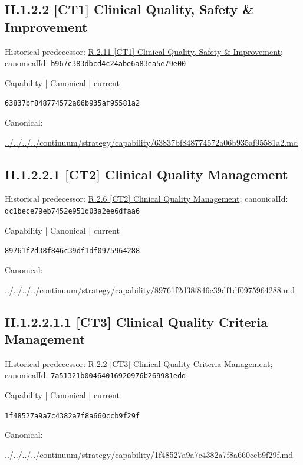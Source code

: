 \documentclass[10pt,a4paper]{article}
\begin{document}
\subsection*{II.1.2.2 [CT1] Clinical Quality, Safety \& Improvement}
Historical predecessor: \hyperref[element-b967c383dbcd4c24abe6a83ea5e79e00]{R.2.11 [CT1] Clinical Quality, Safety \& Improvement}; canonicalId: \texttt{b967c383dbcd4c24abe6a83ea5e79e00}\par
\label{element-63837bf848774572a06b935af95581a2}
{\small Capability | Canonical | current}\par
\texttt{63837bf848774572a06b935af95581a2}\par
Canonical: \par
{\footnotesize\url{../../../../continuum/strategy/capability/63837bf848774572a06b935af95581a2.md}}\par
\subsection*{II.1.2.2.1 [CT2] Clinical Quality Management}
Historical predecessor: \hyperref[element-dc1bece79eb7452e951d03a2ee6dfaa6]{R.2.6 [CT2] Clinical Quality Management}; canonicalId: \texttt{dc1bece79eb7452e951d03a2ee6dfaa6}\par
\label{element-89761f2d38f846c39df1df0975964288}
{\small Capability | Canonical | current}\par
\texttt{89761f2d38f846c39df1df0975964288}\par
Canonical: \par
{\footnotesize\url{../../../../continuum/strategy/capability/89761f2d38f846c39df1df0975964288.md}}\par
\subsection*{II.1.2.2.1.1 [CT3] Clinical Quality Criteria Management}
Historical predecessor: \hyperref[element-7a51321b00464016920976b269981edd]{R.2.2 [CT3] Clinical Quality Criteria Management}; canonicalId: \texttt{7a51321b00464016920976b269981edd}\par
\label{element-1f48527a9a7c4382a7f8a660ccb9f29f}
{\small Capability | Canonical | current}\par
\texttt{1f48527a9a7c4382a7f8a660ccb9f29f}\par
Canonical: \par
{\footnotesize\url{../../../../continuum/strategy/capability/1f48527a9a7c4382a7f8a660ccb9f29f.md}}\par
\end{document}

